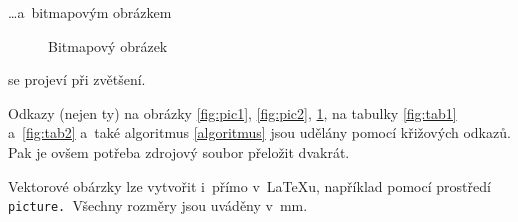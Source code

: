 \documentclass[11pt,a4paper,oneside]{article}
\begin{document}
	\bigskip
	
	\noindent \dots a~bitmapovým obrázkem 
	
	\begin{figure}[H]
  		\centering
		\caption{Bitmapový obrázek}
 		\label{fig:pic3}
	\end{figure}

	\bigskip
	
	\noindent se projeví při zvětšení.
	
	Odkazy (nejen ty) na obrázky \ref{fig:pic1}, \ref{fig:pic2}, \ref{fig:pic3}, na tabulky \ref{fig:tab1} a~\ref{fig:tab2} a~také algoritmus \ref{algoritmus} jsou udělány pomocí křižových odkazů. Pak je ovšem potřeba zdrojový soubor přeložit dvakrát.

Vektorové obárzky lze vytvořit i~přímo v~{\LaTeX}u, například pomocí prostředí\,\,\texttt{picture. }Všechny rozměry jsou uváděny v~mm.

\newpage
\end{document}
